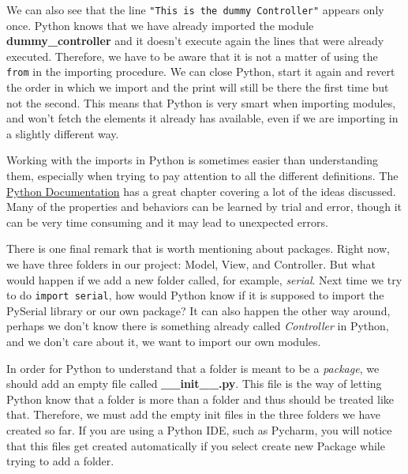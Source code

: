 We can also see that the line \texttt{"This is the dummy Controller"} appears only once. Python knows that we have already imported the module \textbf{dummy\_controller} and it doesn't execute again the lines that were already executed. Therefore, we have to be aware that it is not a matter of using the \texttt{from} in the importing procedure. We can close Python, start it again and revert the order in which we import and the print will still be there the first time but not the second. This means that Python is very smart when importing modules, and won't fetch the elements it already has available, even if we are importing in a slightly different way.  


Working with the imports in Python is sometimes easier than understanding them, especially when trying to pay attention to all the different definitions. The \href{https://docs.python.org/3.6/tutorial/modules.html}{Python Documentation} has a great chapter covering a lot of the ideas discussed. Many of the properties and behaviors can be learned by trial and error, though it can be very time consuming and it may lead to unexpected errors.

There is one final remark that is worth mentioning about packages. Right now, we have three folders in our project: Model, View, and Controller. But what would happen if we add a new folder called, for example, \emph{serial}. Next time we try to do \texttt{import serial}, how would Python know if it is supposed to import the PySerial library or our own package? It can also happen the other way around, perhaps we don't know there is something already called \emph{Controller} in Python, and we don't care about it, we want to import our own modules. 

In order for Python to understand that a folder is meant to be a \emph{package}, we should add an empty file called \textbf{\_\_init\_\_.py}. This file is the way of letting Python know that a folder is more than a folder and thus should be treated like that. Therefore, we must add the empty init files in the three folders we have created so far. If you are using a Python IDE, such as Pycharm, you will notice that this files get created automatically if you select create new Package while trying to add a folder. 

